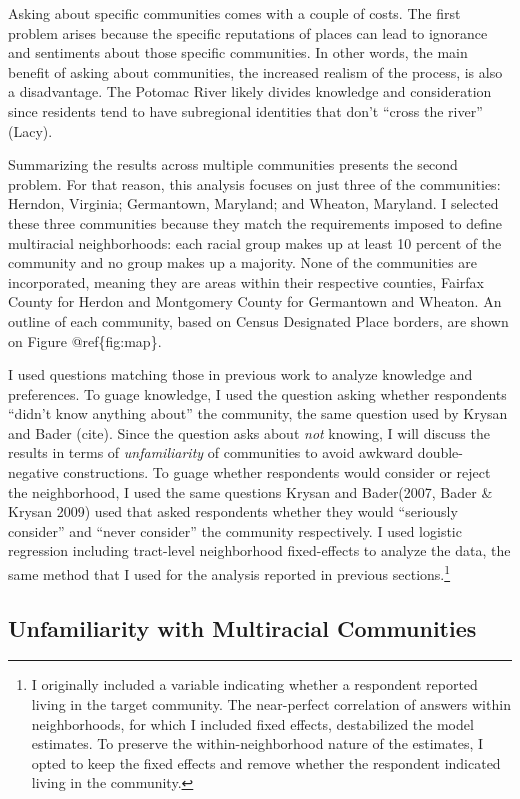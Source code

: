 \documentclass{baderart}
\begin{document}
Asking about specific communities comes with a couple of costs. The first problem arises because the specific reputations of places can lead to ignorance and sentiments about those specific communities. In other words, the main benefit of asking about communities, the increased realism of the process, is also a disadvantage. The Potomac River likely divides knowledge and consideration since residents tend to have subregional identities that don't ``cross the river'' (Lacy).

Summarizing the results across multiple communities presents the second problem. For that reason, this analysis focuses on just three of the communities: Herndon, Virginia; Germantown, Maryland; and Wheaton, Maryland. I selected these three communities because they match the requirements imposed to define multiracial neighborhoods: each racial group makes up at least 10 percent of the community and no group makes up a majority. None of the communities are incorporated, meaning they are areas within their respective counties, Fairfax County for Herdon and Montgomery County for Germantown and Wheaton. An outline of each community, based on Census Designated Place borders, are shown on Figure @ref\{fig:map\}.

I used questions matching those in previous work to analyze knowledge and preferences. To guage knowledge, I used the question asking whether respondents ``didn't know anything about'' the community, the same question used by Krysan and Bader (cite). Since the question asks about \emph{not} knowing, I will discuss the results in terms of \emph{unfamiliarity} of communities to avoid awkward double-negative constructions. To guage whether respondents would consider or reject the neighborhood, I used the same questions Krysan and Bader(2007, Bader \& Krysan 2009) used that asked respondents whether they would ``seriously consider'' and ``never consider'' the community respectively. I used logistic regression including tract-level neighborhood fixed-effects to analyze the data, the same method that I used for the analysis reported in previous sections.\footnote{I originally included a variable indicating whether a respondent reported living in the target community. The near-perfect correlation of answers within neighborhoods, for which I included fixed effects, destabilized the model estimates. To preserve the within-neighborhood nature of the estimates, I opted to keep the fixed effects and remove whether the respondent indicated living in the community.}

\subsection{Unfamiliarity with Multiracial Communities}\label{unfamiliarity-with-multiracial-communities}
\end{document}
